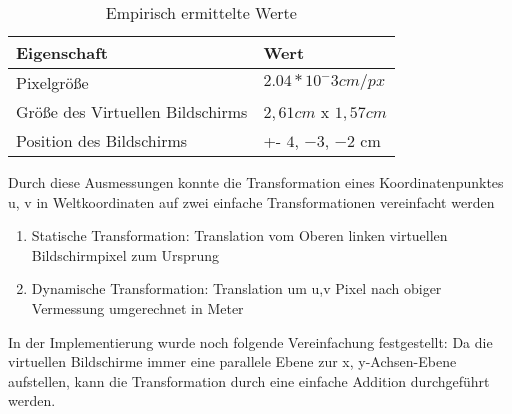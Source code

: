  \begin{table}[h]
 \begin{tabular}{l|l}
  Eigenschaft & Wert \\
  \hline
  \hline
  Pixelgröße & $2.04*10^-3 cm/px$ \\
  Größe des Virtuellen Bildschirms & $2,61 cm$ x $1,57 cm$ \\
  Position des Bildschirms & +- $4$, $-3$, $-2$ cm \\
 \end{tabular}
 \label{tab:konstanteWerte}
 \caption{Empirisch ermittelte Werte}
 \end{table}
Durch diese Ausmessungen konnte die  Transformation eines Koordinatenpunktes u, v in Weltkoordinaten auf zwei einfache Transformationen vereinfacht werden

   \begin{enumerate}
      \item Statische Transformation: Translation vom Oberen linken virtuellen Bildschirmpixel zum Ursprung
      \item Dynamische Transformation: Translation um u,v Pixel nach obiger Vermessung umgerechnet in Meter
   \end{enumerate}


In der Implementierung wurde noch folgende Vereinfachung festgestellt: Da die virtuellen Bildschirme immer eine parallele Ebene zur x, y-Achsen-Ebene aufstellen, kann die Transformation durch eine einfache Addition durchgeführt werden.

